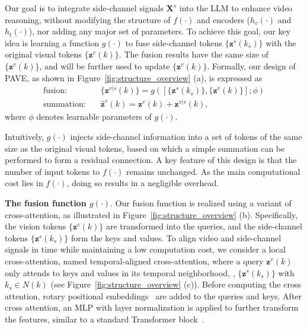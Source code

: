 Our goal is to integrate side-channel signals $\mathbf{X}^s$ into the LLM to enhance video reasoning, without modifying the structure of $f(\cdot)$ and encoders ($h_v(\cdot)$ and $h_t(\cdot)$), nor adding any major set of parameters. To achieve this goal, our key idea is learning a function $g(\cdot)$ to fuse side-channel tokens $\{\mathbf{z}^s(k_s)\}$ with the original visual tokens $\{\mathbf{z}^v(k)\}$. The fusion results have the same size of $\{\mathbf{z}^v(k)\}$, and will be further used to update $\{\mathbf{z}^v(k)\}$. Formally, our design of PAVE, as shown in Figure~\ref{fig:structure_overview} (a), is expressed as
\begin{equation}
\begin{split}
    \text{fusion:} \quad & \{\mathbf{z}^{v|s}(k)\} = g([\{\mathbf{z}^s(k_s)\}, \{\mathbf{z}^v(k)\}]; \phi)\\
    \text{summation:} \quad & \mathbf{\hat{z}}^{v}(k) = \mathbf{z}^{v}(k) + \mathbf{z}^{v|s}(k),
\end{split}\label{eq:pave}
\end{equation}
where $\phi$ denotes learnable parameters of $g(\cdot)$. 

Intuitively, $g(\cdot)$ injects side-channel information into a set of tokens of the same size as the original visual tokens, based on which a simple summation can be performed to form a residual connection. A key feature of this design is that the number of input tokens to $f(\cdot)$ remains unchanged. As the main computational cost lies in $f(\cdot)$, doing so results in a negligible overhead. 

\medskip
\noindent \textbf{The fusion function $g(\cdot)$}. Our fusion function is realized using a variant of cross-attention, as illustrated in Figure~\ref{fig:structure_overview} (b). Specifically, the vision tokens $\{\mathbf{z}^v(k)\}$ are transformed into the queries, and the side-channel tokens $\{\mathbf{z}^s(k_s)\}$ form the keys and values. To align video and side-channel signals in time while maintaining a low computation cost, we consider a local cross-attention, named temporal-aligned cross-attention, where a query $\mathbf{z}^v(k)$ only attends to keys and values in its temporal neighborhood, \ie, $\{\mathbf{z}^s(k_s)\}$ with $k_s \in N(k)$ (see Figure~\ref{fig:structure_overview} (c)). Before computing the cross attention, rotary positional embeddings~\cite{su2024roformer} are added to the queries and keys. After cross attention, an MLP with layer normalization is applied to further transform the features, similar to a standard Transformer block~\cite{vaswani2017attention}.


